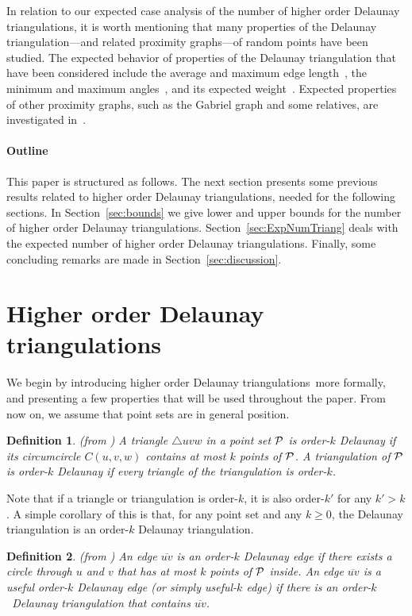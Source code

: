 \documentclass {journal}
\newtheorem {definition} {Definition}
\newcommand{\Pts}{\cal P}
\newcommand {\hodts}{higher order Delaunay triangulations}
\newcommand {\Hodts}{Higher order Delaunay triangulations}
\newcommand {\orderk}{\mbox{order-$k$}}
\begin{document}
In relation to our expected case analysis of the number of \hodts, it is worth mentioning that many properties of the Delaunay triangulation---and related proximity graphs---of random points have been studied.
The expected behavior of properties of the Delaunay triangulation that have been considered include the average and maximum edge length~\cite{m-hpppp-70,bey-eedt-91a}, the minimum and maximum angles~\cite{bey-eedt-91a}, and its expected weight~\cite{cl-aldt-84}.
Expected properties of other proximity graphs, such as the Gabriel graph and some relatives, are investigated in~\cite{d-essgc-88,c-psepg-92,ms-pggrg-80}.


\paragraph{Outline} This paper is structured as follows.
The next section presents some previous results related to \hodts,
needed for the following sections. In Section~\ref{sec:bounds} we
give lower and upper bounds for the number of \hodts.
Section~\ref{sec:ExpNumTriang} deals with the expected number of
\hodts. Finally, some concluding remarks are made in
Section~\ref{sec:discussion}.

\section{\Hodts}
\label{sec:hodts} We begin by introducing \hodts\ more formally,
and presenting a few properties that will be used throughout the
paper. From now on, we assume that point sets are in general
position.



\begin{definition}\label{def:Order}
(from \cite{ghk-hodt-02}) A triangle $\triangle uvw$ in a point set $\Pts$ is \emph{order-$k$ Delaunay} if its circumcircle $C(u,v,w)$ contains at most $k$ points of $\Pts$. A triangulation of $\Pts$ is \emph{order-$k$ Delaunay} if every triangle of the triangulation is order-$k$.
\end{definition}


Note that if a triangle or triangulation is order-$k$, it is also order-$k'$ for any $k'>k$. A simple corollary of this is that, for any point set and  any $k \geq 0$, the Delaunay triangulation is an order-$k$ Delaunay triangulation.

\begin{definition}
(from \cite{ghk-hodt-02}) An edge $\overline{uv}$ is an order-$k$
Delaunay edge if there exists a circle through $u$ and $v$ that
has at most $k$ points of $\Pts$ inside. An edge $\overline{uv}$
is a \emph{useful} order-$k$ Delaunay edge (or simply
\emph{useful-$k$ edge}) if there is an \orderk\ Delaunay
triangulation that contains $\overline{uv}$.
\end{definition}
\end{document}
